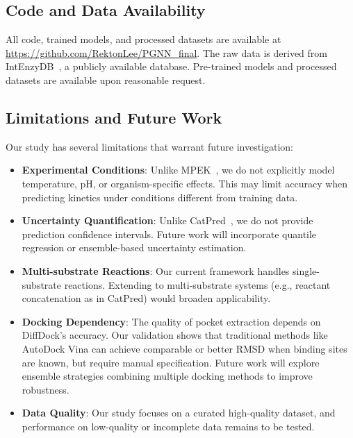 \documentclass[11pt]{article}
\begin{document}
\subsection{Code and Data Availability}
All code, trained models, and processed datasets are available at \url{https://github.com/RektonLee/PGNN_final}. The raw data is derived from IntEnzyDB~\citep{yan2022intenzydb}, a publicly available database. Pre-trained models and processed datasets are available upon reasonable request.

\subsection{Limitations and Future Work}
\label{sec:limitations}
Our study has several limitations that warrant future investigation:

\begin{itemize}
    \item \textbf{Experimental Conditions}: Unlike MPEK~\citep{mpek2024}, we do not explicitly model temperature, pH, or organism-specific effects. This may limit accuracy when predicting kinetics under conditions different from training data.
    
    \item \textbf{Uncertainty Quantification}: Unlike CatPred~\citep{catpred}, we do not provide prediction confidence intervals. Future work will incorporate quantile regression or ensemble-based uncertainty estimation.
    
    \item \textbf{Multi-substrate Reactions}: Our current framework handles single-substrate reactions. Extending to multi-substrate systems (e.g., reactant concatenation as in CatPred) would broaden applicability.
    
    \item \textbf{Docking Dependency}: The quality of pocket extraction depends on DiffDock's accuracy. Our validation shows that traditional methods like AutoDock Vina can achieve comparable or better RMSD when binding sites are known, but require manual specification. Future work will explore ensemble strategies combining multiple docking methods to improve robustness.
    
    \item \textbf{Data Quality}: Our study focuses on a curated high-quality dataset, and performance on low-quality or incomplete data remains to be tested.
\end{itemize}
\end{document}
